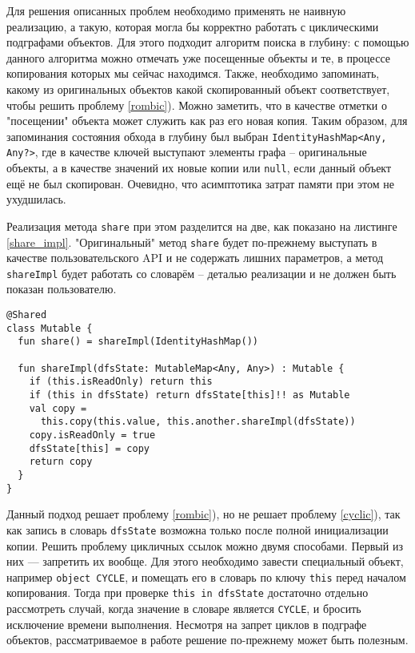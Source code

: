 \documentclass[specification,annotation,times]{itmo-student-thesis}
\begin{document}
Для решения описанных проблем необходимо применять не наивную реализацию,
а такую, которая могла бы корректно работать с циклическими подграфами объектов.
Для этого подходит алгоритм поиска в глубину: с помощью данного алгоритма можно отмечать уже посещенные объекты и те, в процессе копирования которых мы сейчас находимся.
Также, необходимо запоминать, какому из оригинальных объектов какой скопированный объект соответствует, чтобы решить проблему \ref{rombic}). 
Можно заметить, что в качестве отметки о "посещении" объекта может служить как раз его новая копия.
Таким образом, для запоминания состояния обхода в глубину был выбран \texttt{IdentityHashMap<Any, Any?>}, где в качестве ключей выступают элементы графа -- оригинальные объекты, а в качестве значений их новые копии или \texttt{null}, если данный объект ещё не был скопирован.
Очевидно, что асимптотика затрат памяти при этом не ухудшилась.

Реализация метода \texttt{share} при этом разделится на две, как показано на листинге \ref{share_impl}.
"Оригинальный" метод \texttt{share} будет по-прежнему выступать в качестве пользовательского API и не содержать лишних параметров, а метод \texttt{shareImpl} будет работать со словарём -- деталью реализации и не должен быть показан пользователю.

\begin{lstlisting}[float=h!,caption={Усовершенствование share},label={share_impl}]
@Shared
class Mutable {
  fun share() = shareImpl(IdentityHashMap())
    
  fun shareImpl(dfsState: MutableMap<Any, Any>) : Mutable {
    if (this.isReadOnly) return this
	if (this in dfsState) return dfsState[this]!! as Mutable
	val copy = 
	  this.copy(this.value, this.another.shareImpl(dfsState))
	copy.isReadOnly = true
	dfsState[this] = copy
	return copy
  }
}
\end{lstlisting}

Данный подход решает проблему \ref{rombic}), но не решает проблему \ref{cyclic}), так как запись в словарь \texttt{dfsState} возможна только после полной инициализации копии.
Решить проблему цикличных ссылок можно двумя способами. Первый из них --- запретить их вообще. Для этого необходимо завести специальный объект, например \texttt{object CYCLE}, и помещать его в словарь по ключу \texttt{this} перед началом копирования.
Тогда при проверке \texttt{this in dfsState} достаточно отдельно рассмотреть случай, когда значение в словаре является \texttt{CYCLE}, и бросить исключение времени выполнения.
Несмотря на запрет циклов в подграфе объектов, рассматриваемое в работе решение по-прежнему может быть полезным.
\end{document}
